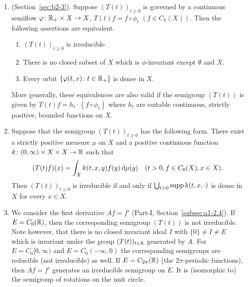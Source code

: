 \begin{examples}\label{ex:b3-3.4}
%
	
\begin{enumerate}[\upshape (i), wide, labelindent=.25em]
	\item 
	(\cf Section~\ref{sec:b2-3}). Suppose $(T(t))_{t\geq 0}$ is governed by a continuous semiflow
     $\phi \colon \R_{+} \times X \to X$, \ie $T(t)f = f\circ\phi_{t}$ $(f\in C_{0}(X))$.
	Then the following assertions are equivalent.
	\begin{enumerate}[\upshape (a)]
		\item 
		$(T(t))_{t\geq 0}$ is irreducible.
	
		\item 
		There is no closed subset of\/ $X$ which is $\phi$-invariant except $\emptyset$ and $X$.
	
		\item 
		Every orbit $\{\phi(t,x) \colon t \in \R_{+}\}$ is dense in $X$.
	\end{enumerate}
	More generally, these equivalences are also valid if the semigroup $(T(t))$ is given by $T(t)f = h_{t}\cdot(f\circ\phi_{t})$ where $h_{t}$ are suitable continuous, strictly positive, bounded functions on $X$.
	
	\item 
	Suppose that the semigroup $(T(t))_{t\geq 0}$ has the following form. 
    There exist a strictly positive measure $\mu$ on $X$ and a positive continuous function $k \colon (0,\infty) \times X \times X \to \mathbb{R}$ such that
	\begin{equation}\label{eq:b3-3.1}
		(T(t)f)(x) = \int_{X} k(t,x,y)f(y) \mathop{}\!\mathrm{d}{\mu}(y) \quad (t > 0, f \in C_{0}(X), x \in X).		
	\end{equation}	
	Then $(T(t))_{t\geq 0}$ is irreducible if and only if\/ $\bigcup_{t>0}\mathop{}\!\mathrm{supp}\, k(t,x,\cdot)$ is dense in $X$ for every $x \in X$.
	
	\item 
	We consider the first derivative $Af = f'$ (\cf Part-I, Section~\ref{subsec:a1-2.4}). 
    If\/ $E = C_{0}(\mathbb{R})$, then the corresponding semigroup $(T(t))$ is not irreducible.
	Note however, that there is no closed invariant ideal $I$ with $\{0\} \neq I \neq E$ which is invariant under the group $(T(t))_{t\in\mathbb{R}}$ generated by $A$.
	For $E = C_{0}[0,\infty)$ and $E = C_{0}(-\infty,0)$ the corresponding semigroups are reducible (\ie not irreducible) as well.
	If\/ $E = C_{2\pi}(\mathbb{R})$ (\ie the $2\pi$-periodic functions), then $Af = f'$ generates an irreducible semigroup on $E$.
	It is (isomorphic to) the semigroup of rotations on the unit circle.
    

\end{enumerate}
\end{examples}
